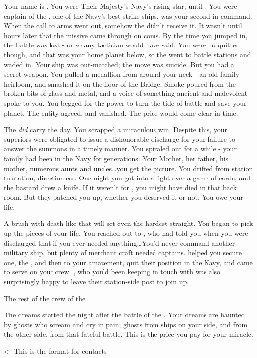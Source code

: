 \documentclass[char]{TMFHope}
\begin{document}
\name{\cCap{}}

Your name is \cCap{}. You were Their Majesty's Navy's rising star, until \pBattle{}. You were captain of the \cOld{}, one of the Navy's best strike ships. \cXO{} was your second in command. When the call to arms went out, somehow the \cOld{} didn't receive it. It wasn't until hours later that the  missive came through on coms. By the time you jumped in, the battle was lost - or so any tactician would have said. You were no quitter though, and that was your home planet below, so the \cOld{} went to battle stations and waded in. Your ship was out-matched; the move was suicide. But you had a secret weapon. You pulled a medallion from around your neck - an old family heirloom, and smashed it on the floor of the Bridge. Smoke poured from the broken bits of glass and metal, and a voice of something ancient and malevolent spoke to you. You begged for the power to turn the tide of battle and save your planet. The entity agreed, and vanished. The price would come clear in time.

The \cOld{} \emph{did} carry the day. You scrapped a miraculous win. Despite this, your superiors were obligated to issue a dishonorable discharge for your failure to answer the summons in a timely manner. You spiraled out for a while - your family had been in the Navy for generations. Your Mother, her father, his mother, numerous aunts and uncles\ldots you get the picture. You drifted from station to station, directionless. One night you got into a fight over a game of cards, and the bastard drew a knife. If it weren't for \cMed{}, you might have died in that back room. But they patched you up, whether you deserved it or not. You owe \cMed{} your life.

A brush with death like that will set even the hardest \cCap{\human} straight. You began to pick up the pieces of your life. You reached out to \cXO{}, who had told you when you were discharged that if you ever needed anything\ldots You'd never command another military ship, but plenty of merchant craft needed captains. \cXO{} helped you secure one, the \cNew{}, and then to your amazement, quit their position in the Navy, and came to serve on your crew. \cMed{}, who you'd been keeping in touch with was also surprisingly happy to leave their station-side post to join up.

The rest of the crew of the \cNew

The dreams started the night after the battle of the \cOld{}. Your dreams are haunted by ghosts who scream and cry in pain; ghosts from ships on your side, and from the other side, from that fateful battle. This is the price you pay for your miracle.	

\begin{itemz}[Goals]
	\item 
\end{itemz}

\begin{itemz}[Notes]
	\item 
\end{itemz}

\begin{contacts}
	\contact{\cTest{}} <- This is the format for contacts 
\end{contacts}
\end{document}
